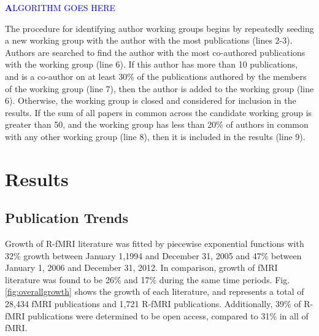 \documentclass[5p]{elsarticle}
\begin{document}
\textcolor{blue}{\textbf ALGORITHM GOES HERE}

The procedure for identifying author working groups begins by repeatedly seeding
a new working group with the author with the most publications (lines 2-3).
Authors are searched to find the author with the most co-authored publications
with the working group (line 6). If this author has more than 10 publications,
and is a co-author on at least 30\% of the publications authored by the members
of the working group (line 7), then the author is added to the working group
(line 6). Otherwise, the working group is closed and considered for inclusion in
the results. If the sum of all papers in common across the candidate working
group is greater than 50, and the working group has less than 20\% of authors in
common with any other working group (line 8), then it is included in the results
(line 9).


\section{Results}

\subsection{Publication Trends}
Growth of R-fMRI literature was fitted by piecewise exponential functions with
32\% growth between January 1,1994 and December 31, 2005 and 47\% between January
1, 2006 and December 31, 2012. In comparison, growth of fMRI literature was
found to be 26\% and 17\% during the same time periods. Fig.
\ref{fig:overallgrowth} shows the growth
of each literature, and represents a total of 28,434 fMRI publications and 1,721
R-fMRI publications. Additionally, 39\% of R-fMRI publications were determined to
be open access, compared to 31\% in all of fMRI.
\end{document}
